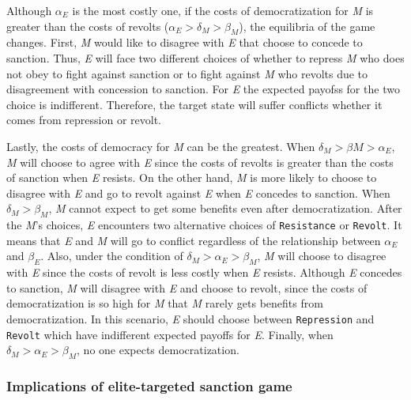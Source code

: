 \documentclass[11pt]{article}
\begin{document}
Although $\alpha_{E}$ is the most costly one, if the costs of democratization for \textit{M} is greater than the costs of revolts ($\alpha_{E} > \delta_{M} > \beta_{M}$), the equilibria of the game changes. First, \textit{M} would like to disagree with \textit{E} that choose to concede to sanction. Thus, \textit{E} will face two different choices of whether to repress \textit{M} who does not obey to fight against sanction or to fight against \textit{M} who revolts due to disagreement with concession to sanction. For \textit{E} the expected payofss for the two choice is indifferent. Therefore, the target state will suffer conflicts whether it comes from repression or revolt.

Lastly, the costs of democracy for \textit{M} can be the greatest. When $\delta_{M} > \beta{M} > \alpha_{E}$, \textit{M} will choose to agree with \textit{E} since the costs of revolts is greater than the costs of sanction when \textit{E} resists. On the other hand, \textit{M} is more likely to choose to disagree with \textit{E} and go to revolt against \textit{E} when \textit{E} concedes to sanction. When $\delta_{M} > \beta_{M}$, \textit{M} cannot expect to get some benefits even after democratization. After the \textit{M}'s choices, \textit{E} encounters two alternative choices of \texttt{Resistance} or \texttt{Revolt}. It means that \textit{E} and \textit{M} will go to conflict regardless of the relationship between $\alpha_{E}$ and $\beta_{E}$. Also, under the condition of $\delta_{M} > \alpha_{E} > \beta_{M}$, \textit{M} will choose to disagree with \textit{E} since the costs of revolt is less costly when \textit{E} resists. Although \textit{E} concedes to sanction, \textit{M} will disagree with \textit{E} and choose to revolt, since the costs of democratization is so high for \textit{M} that \textit{M} rarely gets benefits from democratization. In this scenario, \textit{E} should choose between \texttt{Repression} and \texttt{Revolt} which have indifferent expected payoffs for \textit{E}. Finally, when $\delta_{M} > \alpha_{E} > \beta_{M}$, no one expects democratization.

	
\subsubsection*{Implications of elite-targeted sanction game}

\end{document}
